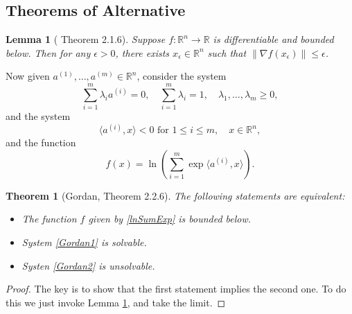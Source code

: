 \documentclass[openany]{book}
\newtheorem{lemma}{Lemma}[chapter]
\newtheorem{theorem}{Theorem}[chapter]
\theoremstyle{definition}
\theoremstyle{remark}
\begin{document}
\subsection{Theorems of Alternative}
\begin{lemma}[\cite{BL10} Theorem 2.1.6]\label{lem:boundedBelowSmallGrad}
    Suppose $f:\mathbb{R}^n\to \mathbb{R}$ is differentiable and bounded below. Then for any $\epsilon>0$, there exists $x_{\epsilon}\in \mathbb{R}^n$ such that $\|\nabla f(x_{\epsilon})\|\le\epsilon$.
\end{lemma}
Now given $a^{(1)},\ldots,a^{(m)}\in \mathbb{R}^n$, consider the system
\begin{equation}\label{Gordan1}
    \sum_{i=1}^{m}\lambda_ia^{(i)}=0,\quad \sum_{i=1}^{m}\lambda_i=1,\quad\lambda_1,\ldots,\lambda_m\ge0,
\end{equation}
and the system
\begin{equation}\label{Gordan2}
    \langle a^{(i)},x\rangle<0\textrm{ for }1\le i\le m,\quad x\in \mathbb{R}^n,
\end{equation}
and the function
\begin{equation}\label{lnSumExp}
    f(x)=\ln\left(\sum_{i=1}^{m}\exp \langle a^{(i)},x\rangle\right).
\end{equation}
\begin{theorem}[Gordan, \cite{BL10} Theorem 2.2.6]\label{thm:Gordan}
    The following statements are equivalent:
    \begin{itemize}
        \item The function $f$ given by \eqref{lnSumExp} is bounded below.
        \item System \eqref{Gordan1} is solvable.
        \item Systen \eqref{Gordan2} is unsolvable.
    \end{itemize}
\end{theorem}
\begin{proof}
    The key is to show that the first statement implies the second one. To do this we just invoke Lemma \ref{lem:boundedBelowSmallGrad}, and take the limit.
\end{proof}
\end{document}
